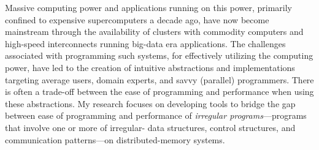Massive computing power and applications running on this power, primarily confined to expensive supercomputers a decade ago, have now become mainstream through the availability of clusters with commodity computers and high-speed interconnects running big-data era applications. 
The challenges associated with programming such systems, for effectively utilizing the computing power, have led to the creation of intuitive abstractions and implementations targeting average users, domain experts, and savvy (parallel) programmers. 
There is often a trade-off between the ease of programming and performance when using these abstractions. 
My research focuses on developing tools to bridge the gap between ease of programming and performance of {\em irregular programs}---programs that involve one or more of irregular- data structures, control structures, and communication patterns---on distributed-memory systems. 

